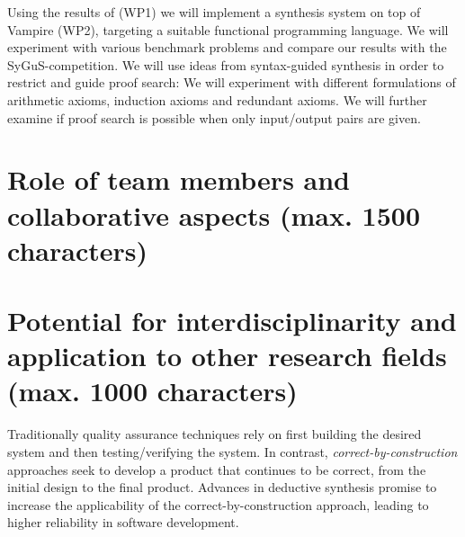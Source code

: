 \documentclass[a4paper,12pt]{article}
\begin{document}
Using the results of (WP1) we will implement a synthesis system on top of Vampire (WP2), targeting a suitable functional programming language.
We will experiment with various benchmark problems %
and compare our results with the SyGuS-competition.
We will use ideas from syntax-guided synthesis in order to restrict and guide proof search:
We will experiment with different formulations of arithmetic axioms, induction axioms and redundant axioms.
We will further examine if proof search is possible when only input/output pairs are given.
	
\section{Role of team members and collaborative aspects (max. 1500 characters)}

\section{Potential for interdisciplinarity and application to other research fields (max. 1000 characters)}


Traditionally quality assurance techniques rely on first building the desired system and then testing/verifying the system.
In contrast, \emph{correct-by-construction} approaches seek to develop a product that continues to be correct, from the initial design to the final product.
Advances in deductive synthesis promise to increase the applicability of the correct-by-construction approach, leading to higher reliability in software development.
\end{document}
